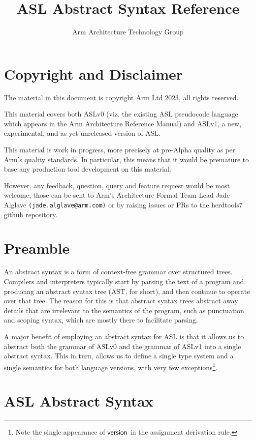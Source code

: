 \documentclass{book}
\author{Arm Architecture Technology Group}
\title{ASL Abstract Syntax Reference}
\begin{document}
\maketitle

\tableofcontents{}

\chapter{Copyright and Disclaimer}

The material in this document is copyright Arm Ltd 2023, all rights reserved.

This material covers both ASLv0 (viz, the existing ASL pseudocode language
which appears in the Arm Architecture Reference Manual) and ASLv1, a new,
experimental, and as yet unreleased version of ASL.

This material is work in progress, more precisely at pre-Alpha quality as
per Arm’s quality standards. In particular, this means that it would be
premature to base any production tool development on this material.

However, any feedback, question, query and feature request would be most
welcome; those can be sent to Arm’s Architecture Formal Team Lead Jade
Alglave \texttt{(jade.alglave@arm.com)} or by raising issues or PRs to the herdtools7
github repository.

\chapter{Preamble}
An abstract syntax is a form of context-free grammar over structured trees. Compilers and interpreters typically start by parsing the text of a program and producing an abstract syntax tree (AST, for short), and then continue to operate over that tree.
%
The reason for this is that abstract syntax trees abstract away details that are irrelevant to the semantics of the program, such as punctuation and scoping syntax, which are mostly there to facilitate parsing.

A major benefit of employing an abstract syntax for ASL is that it allows us to abstract both the grammar of ASLv0 and the grammar of ASLv1 into a single abstract syntax. This in turn, allows us to define a single type system and a single semantics for both language versions, with very few exceptions\footnote{Note the single appearance of $\textsf{version}$ in the assignment derivation rule.}.

\chapter{ASL Abstract Syntax}
\end{document}

